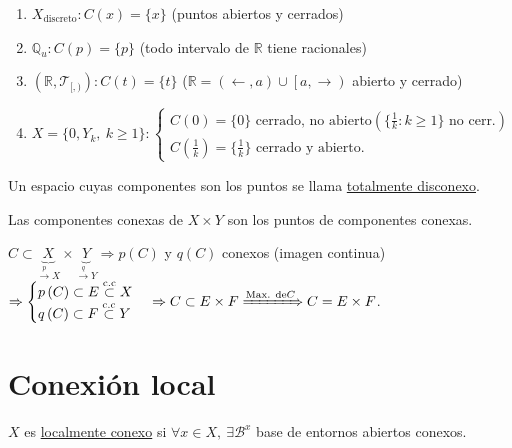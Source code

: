 \begin{ej}
\begin{enumerate}
    \item $X_{\text{discreto}}: C\left( x \right) = \{x\}$ (puntos abiertos y cerrados)
    \item $\mathbb{Q}_u : C\left( p \right) = \{p\}$ (todo intervalo de $\mathbb{R}$ tiene racionales)
    \item $\left( \mathbb{R}, \mathcal{T}_{[, )} \right): C\left( t \right) = \{t\}$ ($\mathbb{R} = \left( \leftarrow, a \right) \cup \left[ a, \rightarrow \right)$ abierto y cerrado)
    \item $X = \{0, Y_k,\ k \ge 1\} : \begin{cases}
        C\left( 0 \right) = \{0\} \text{ cerrado, no abierto} \left( \{\frac{1}{k}: k\ge 1 \}  \text{ no cerr.}\right)\\
        C\left( \frac{1}{k} \right) = \{\frac{1}{k}\} \text{ cerrado y abierto.} 
    \end{cases} $
\end{enumerate}
\end{ej}

\begin{defi}
Un espacio cuyas componentes son los puntos se llama \underline{totalmente disconexo}. 
\end{defi}

\begin{prop}
Las componentes conexas de $X \times Y$ son los puntos de componentes conexas.
\end{prop}
\begin{demo}
$C \subset \underbrace{X}_{\xrightarrow{p} X} \times \underbrace{Y}_{\xrightarrow{q} Y} \Rightarrow p\left( C \right)$ y $q\left( C \right)$ conexos (imagen continua) $\Rightarrow \begin{cases}
    p\left( C \right) \subset E \stackrel{\text{c.c}}{\subset}  X\\
    q\left( C \right) \subset F \stackrel{\text{c.c}}{\subset}  Y
\end{cases} \Rightarrow C \subset E \times F \xRightarrow{\text{Max. de} C} C = E\times F$.
\end{demo}

\section{Conexión local}%
\label{sec:conexion_local}
\begin{defi}
$X$ es \underline{localmente conexo}  si $\forall x \in X,\ \exists \mathcal{B}^x$ base de entornos abiertos conexos.
\end{defi}

